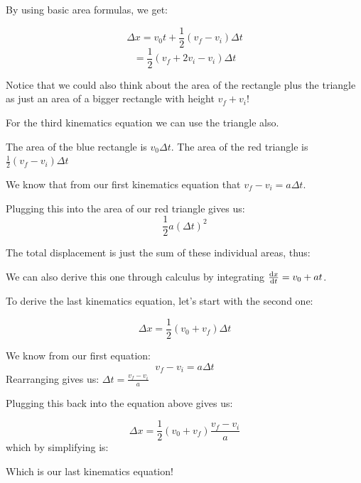 \documentclass{report}
\begin{document}
By using basic area formulas, we get:

$$\Delta x = v_0t + \frac{1}{2}(v_f-v_i)\Delta t$$
$$= \frac{1}{2}(v_f+2v_i-v_i)\Delta t$$

Notice that we could also think about the area of the rectangle plus the triangle as just an area of a bigger rectangle with height $v_f+v_i$!

For the third kinematics equation we can use the triangle also.

The area of the blue rectangle is $v_0 \Delta t$. The area of the red triangle is $\frac{1}{2}(v_f-v_i)\Delta t$

We know that from our first kinematics equation that $v_f -v_i = a\Delta t$.

Plugging this into the area of our red triangle gives us:
$$\frac{1}{2}a(\Delta t)^2$$

The total displacement is just the sum of these individual areas, thus:


We can also derive this one through calculus by integrating $\dv{x}{t} = v_0 + at$.

To derive the last kinematics equation, let's start with the second one:

$$\Delta x = \frac{1}{2}(v_0+v_f)\Delta t$$

We know from our first equation: 
$$v_f - v_i = a\Delta t$$
Rearranging gives us:
$\Delta t = \frac{v_f-v_i}{a}$

Plugging this back into the equation above gives us:

$$\Delta x = \frac{1}{2}(v_0+v_f)\frac{v_f-v_i}{a}$$
which by simplifying is:


Which is our last kinematics equation!
\end{document}
